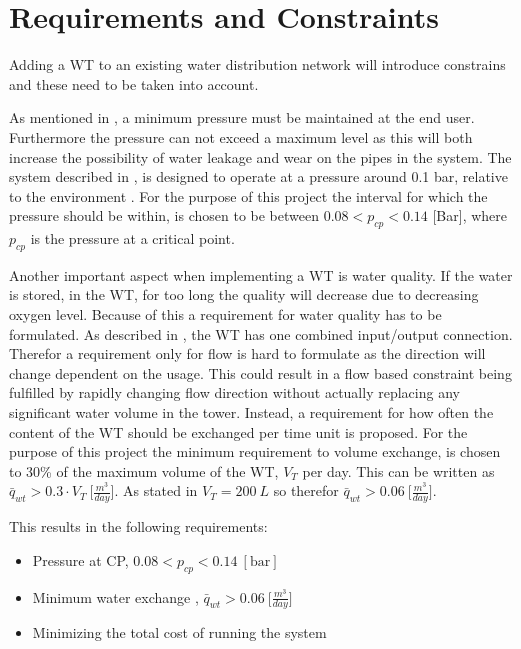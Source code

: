 \chapter{Requirements and Constraints}
\label{Requirements_and_constraints}

Adding a WT to an existing water distribution network will introduce constrains and these need to be taken into account. 

As mentioned in , a minimum pressure must be maintained at the end user. Furthermore the pressure can not exceed a maximum level as this will both increase the possibility of water leakage and wear on the pipes in the system. The system described in , is designed to operate at a pressure around 0.1 bar, relative to the environment \cite{master_aau}. For the purpose of this project the interval for which the pressure should be within, is chosen to be between $0.08 < p_{cp} < 0.14$ [Bar], where $p_{cp}$ is the pressure at a critical point.

Another important aspect when implementing a WT is water quality. If the water is stored, in the WT, for too long the quality will decrease due to decreasing oxygen level. Because of this a requirement for water quality has to be formulated. As described in , the WT has one combined input/output connection. Therefor a requirement only for flow is hard to formulate as the direction will change dependent on the usage. This could result in a flow based constraint being fulfilled by rapidly changing flow direction without actually replacing any significant water volume in the tower. Instead, a requirement for how often the content of the WT should be exchanged per time unit is proposed. For the purpose of this project the minimum requirement to volume exchange, is chosen to 30\% of the maximum volume of the WT, $V_T$ per day. This can be written as $\bar{q}_{wt} > 0.3\cdot V_T \: \big[\frac{m^3}{day}\big]$. As stated in  $V_T = 200 \:L$ so therefor $\bar{q}_{wt} > 0.06 \: \big[\frac{m^3}{day}\big]$.

This results in the following requirements:

\begin{itemize}
	\item Pressure at CP, $0.08 < p_{cp} < 0.14 \:[\text{bar}]$
%
	\item Minimum water exchange , $\bar{q}_{wt} > 0.06 \: \big[\frac{m^3}{day}\big]$
%
	\item Minimizing the total cost of running the system
\end{itemize}